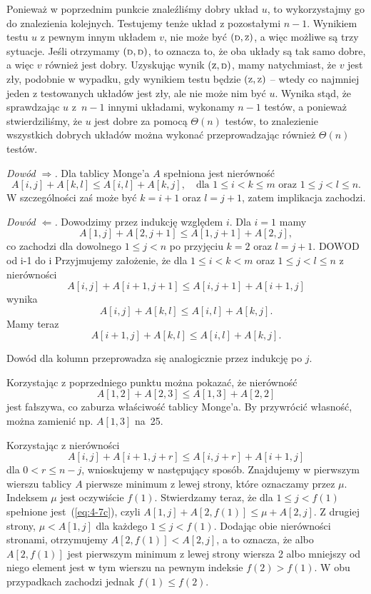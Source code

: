 Ponieważ w poprzednim punkcie znaleźliśmy dobry układ $u$, to wykorzystajmy go do znalezienia kolejnych. Testujemy tenże układ z pozostałymi $n-1$. Wynikiem testu $u$ z pewnym innym układem $v$, nie może być $({\scriptstyle\rm D},{\scriptstyle\rm Z})$, a więc możliwe są trzy sytuacje. Jeśli otrzymamy $({\scriptstyle\rm D},{\scriptstyle\rm D})$, to oznacza to, że oba układy są tak samo dobre, a więc $v$ również jest dobry. Uzyskując wynik $({\scriptstyle\rm Z},{\scriptstyle\rm D})$, mamy natychmiast, że $v$ jest zły, podobnie w wypadku, gdy wynikiem testu będzie $({\scriptstyle\rm Z},{\scriptstyle\rm Z})$ -- wtedy co najmniej jeden z testowanych układów jest zły, ale nie może nim być $u$. Wynika stąd, że sprawdzając $u$ z~$n-1$ innymi układami, wykonamy $n-1$ testów, a ponieważ stwierdziliśmy, że $u$ jest dobre za pomocą $\Theta(n)$ testów, to znalezienie wszystkich dobrych układów można wykonać przeprowadzając również $\Theta(n)$ testów.


\subexercise{} %
\noindent\emph{Dowód $\Rightarrow$.} Dla tablicy Monge'a $A$ spełniona jest nierówność
\[
	A[i,j]+A[k,l] \le A[i,l]+A[k,j], \quad\text{dla $1\le i<k\le m$ oraz $1\le j<l\le n$}.
\]
W szczególności zaś może być $k=i+1$ oraz $l=j+1$, zatem implikacja zachodzi.
\bigskip

\noindent\emph{Dowód $\Leftarrow$.} Dowodzimy przez indukcję względem $i$. Dla $i=1$ mamy
\[
	A[1,j]+A[2,j+1] \le A[1,j+1]+A[2,j],
\]
co zachodzi dla dowolnego $1\le j<n$ po przyjęciu $k=2$ oraz $l=j+1$.
DOWOD od i-1 do i
Przyjmujemy założenie, że dla $1\le i<k<m$ oraz $1\le j<l\le n$ z nierówności
\[
	A[i,j]+A[i+1,j+1] \le A[i,j+1]+A[i+1,j]
\]
wynika
\[
	A[i,j]+A[k,l] \le A[i,l]+A[k,j].
\]
Mamy teraz
\[
	A[i+1,j]+A[k,l] \le A[i,l]+A[k,j].
\]

Dowód dla kolumn przeprowadza się analogicznie przez indukcję po $j$.

\subexercise{} %
Korzystając z poprzedniego punktu można pokazać, że nierówność
\[
	A[1,2]+A[2,3] \le A[1,3]+A[2,2]
\]
jest fałszywa, co zaburza właściwość tablicy Monge'a. By przywrócić własność, można zamienić np. $A[1,3]$ na~25.

\subexercise{} %
Korzystając z nierówności
\begin{equation}
	A[i,j]+A[i+1,j+r] \le A[i,j+r]+A[i+1,j] \label{eq:4-7c}
\end{equation}
dla $0<r\le n-j$, wnioskujemy w następujący sposób. Znajdujemy w pierwszym wierszu tablicy $A$ pierwsze minimum z lewej strony, które oznaczamy przez $\mu$. Indeksem $\mu$ jest oczywiście $f(1)$. Stwierdzamy teraz, że dla $1\le j<f(1)$ spełnione jest~(\ref{eq:4-7c}), czyli $A[1,j]+A[2,f(1)]\le\mu+A[2,j]$. Z drugiej strony, $\mu<A[1,j]$ dla każdego $1\le j<f(1)$. Dodając obie nierówności stronami, otrzymujemy $A[2,f(1)]<A[2,j]$, a to oznacza, że albo $A[2,f(1)]$ jest pierwszym minimum z lewej strony wiersza 2 albo mniejszy od niego element jest w tym wierszu na pewnym indeksie $f(2)>f(1)$. W obu przypadkach zachodzi jednak $f(1)\le f(2)$.


